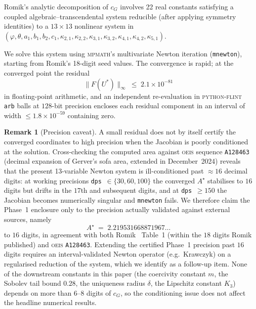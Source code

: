 \documentclass[11pt]{amsart}
\theoremstyle{plain}
\theoremstyle{definition}
\newtheorem{remark}[theorem]{Remark}
\newcommand{\cG}{c_{G}}
\newcommand{\Astar}{A^{\star}}
\begin{document}
Romik's analytic decomposition of $\cG$ involves 22 real constants
satisfying a coupled algebraic--transcendental system reducible (after
applying symmetry identities) to a $13 \times 13$ nonlinear system in
$(\varphi, \theta, a_{1}, b_{1}, b_{2}, c_{1}, \kappa_{2,1},
\kappa_{2,2}, \kappa_{3,1}, \kappa_{3,2}, \kappa_{4,1}, \kappa_{4,2},
\kappa_{5,1})$.

We solve this system using \textsc{mpmath}'s multivariate Newton
iteration (\texttt{mnewton}), starting from Romik's 18-digit seed
values.  The convergence is rapid; at the converged point the
residual
\begin{equation}
  \|F(U^{*})\|_{\infty} \;\leq\; 2.1 \times 10^{-81}
\end{equation}
in floating-point arithmetic, and an independent re-evaluation in
\textsc{python-flint} \texttt{arb} balls at $128$-bit precision
encloses each residual component in an interval of width
$\leq 1.8 \times 10^{-59}$ containing zero.

\begin{remark}[Precision caveat]\label{rem:phase1-precision}
A small residual does not by itself certify the converged
coordinates to high precision when the Jacobian is poorly
conditioned at the solution.  Cross-checking the computed area
against \textsc{oeis} sequence \texttt{A128463} (decimal expansion
of Gerver's sofa area, extended in December~2024) reveals that the
present 13-variable Newton system is ill-conditioned past
$\approx 16$ decimal digits: at working precisions
\texttt{dps}~$\in \{30, 60, 100\}$ the converged $\Astar$ stabilises
to $16$ digits but drifts in the $17$th and subsequent digits, and
at \texttt{dps}~$\geq 150$ the Jacobian becomes numerically
singular and \texttt{mnewton} fails.  We therefore claim the
Phase~1 enclosure only to the precision actually validated against
external sources, namely
\begin{equation}\label{eq:Astar-certified}
  \Astar \;=\; 2.219531668871967\ldots
\end{equation}
to $16$ digits, in agreement with both Romik~\cite{Romik2018}
Table~1 (within the $18$ digits Romik published) and
\textsc{oeis} \texttt{A128463}.  Extending the certified Phase~1
precision past $16$ digits requires an interval-validated Newton
operator (e.g.~Krawczyk) on a regularised reduction of the system,
which we identify as a follow-up item.  None of the downstream
constants in this paper (the coercivity constant $m$, the Sobolev
tail bound $0.28$, the uniqueness radius $\delta$, the Lipschitz
constant $K_{3}$) depends on more than $6$--$8$ digits of $\cG$,
so the conditioning issue does not affect the headline numerical
results.
\end{remark}
\end{document}

